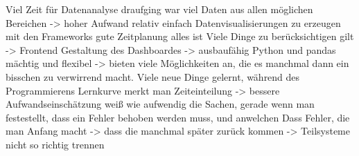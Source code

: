 




Viel Zeit für Datenanalyse draufging
war viel Daten aus allen möglichen Bereichen -> hoher Aufwand
relativ einfach Datenvisualisierungen zu erzeugen mit den Frameworks
gute Zeitplanung alles ist
Viele Dinge zu berücksichtigen gilt -> Frontend Gestaltung des Dashboardes -> ausbaufähig
Python und pandas mächtig und flexibel ->  bieten  viele Möglichkeiten an, die es manchmal 
dann ein bisschen zu verwirrend macht. Viele neue Dinge gelernt, während des Programmierens
Lernkurve merkt man
Zeiteinteilung -> bessere Aufwandseinschätzung weiß wie aufwendig die Sachen, gerade wenn man festestellt,
dass ein Fehler behoben werden muss, und anwelchen
Dass Fehler, die man Anfang macht -> dass die manchmal später zurück kommen -> Teilsysteme nicht so richtig trennen


